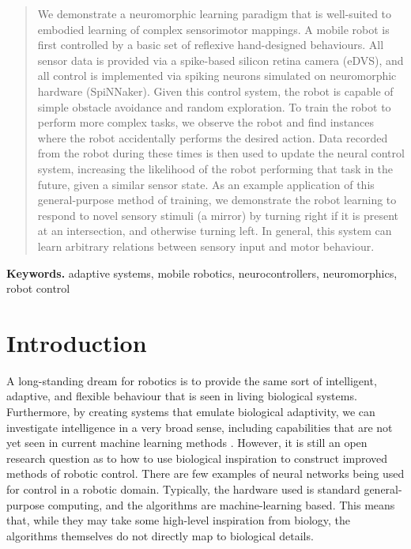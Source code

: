 \documentclass[conference]{IEEEtran}
\begin{document}
\begin{abstract}
We demonstrate a neuromorphic learning paradigm that is well-suited 
to embodied learning of complex sensorimotor mappings. A mobile robot 
is first controlled by a basic set of reflexive hand-designed behaviours. 
All sensor data is provided via a spike-based silicon retina camera 
(eDVS), and all control is implemented via spiking neurons simulated 
on neuromorphic hardware (SpiNNaker). Given this control 
system, the robot is capable of simple obstacle avoidance and random 
exploration. To train the robot to perform more complex tasks, we 
observe the robot and find instances where the robot accidentally 
performs the desired action. Data recorded from the 
robot during these times is then used to update the neural control 
system, increasing the likelihood of the robot performing that task 
in the future, given a similar sensor state. As an example application
of this general-purpose method of training, we demonstrate the
robot learning to respond to novel sensory stimuli (a mirror) by turning
right if it is present at an intersection, and otherwise turning left.
In general, this system can learn arbitrary relations between sensory
input and motor behaviour.

\end{abstract}
\medskip
\noindent \textbf{Keywords.} adaptive systems, mobile robotics, neurocontrollers, neuromorphics, robot control


\IEEEpeerreviewmaketitle


\section{Introduction}

A long-standing dream for robotics is to provide the same sort of
intelligent, adaptive, and flexible behaviour that is seen in living
biological systems.  Furthermore, by creating systems that emulate
biological adaptivity, we can investigate intelligence in a very broad sense,
including capabilities that are not yet seen in current machine learning
methods \cite{mcfarland1993intelligent}.  However, it is still an open
research question as to how to use biological inspiration to construct
improved methods of robotic control.  There are few examples of neural networks 
being used for control \cite{janglova2005neural} in a robotic domain. 
Typically, the hardware used is standard general-purpose computing, and the 
algorithms are machine-learning based. This means that, while they may take
some high-level inspiration from biology, the algorithms themselves do not
directly map to biological details.
\end{document}
